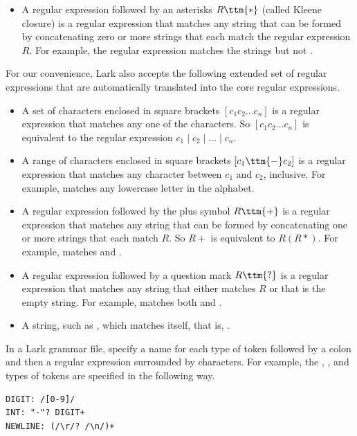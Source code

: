 \documentclass[7x10]{TimesAPriori_MIT}%
\numberwithin{theorem}{chapter}
\numberwithin{definition}{chapter}
\numberwithin{equation}{chapter}
\begin{document}
{\begin{itemize}
\item A regular expression followed by an asterisks $R\ttm{*}$ (called
  Kleene closure) is a regular expression that matches any string that
  can be formed by concatenating zero or more strings that each match
  the regular expression $R$.  For example, the regular expression
   matches the strings  but not
  .
\end{itemize}

For our convenience, Lark also accepts the following extended set of
regular expressions that are automatically translated into the core
regular expressions.

\begin{itemize}
\item A set of characters enclosed in square brackets $[c_1 c_2 \ldots
  c_n]$ is a regular expression that matches any one of the
  characters. So $[c_1 c_2 \ldots c_n]$  is equivalent to
  the regular expression $c_1\mid c_2\mid \ldots \mid c_n$.
\item A range of characters enclosed in square brackets $[c_1\ttm{-}c_2]$ is
  a regular expression that matches any character between $c_1$ and
  $c_2$, inclusive. For example, \code{[a-z]} matches any lowercase
  letter in the alphabet.
\item A regular expression followed by the plus symbol $R\ttm{+}$
  is a regular expression that matches any string that can
  be formed by concatenating one or more strings that each match $R$.
  So $R+$ is equivalent to $R(R*)$. For example, \code{[a-z]+}
  matches  and .
\item A regular expression followed by a question mark $R\ttm{?}$
  is a regular expression that matches any string that either
  matches $R$ or that is the empty string.
  For example,   matches both  and .
\item A string, such as , which matches itself,
    that is, .
\end{itemize}

In a Lark grammar file, specify a name for each type of token followed
by a colon and then a regular expression surrounded by \code{/}
characters. For example, the , , and
 types of tokens are specified in the following way.
\begin{center}
\begin{minipage}{0.95\textwidth}
\begin{lstlisting}
DIGIT: /[0-9]/
INT: "-"? DIGIT+
NEWLINE: (/\r/? /\n/)+
\end{lstlisting}
\end{minipage}
\end{center}

}
\end{document}
